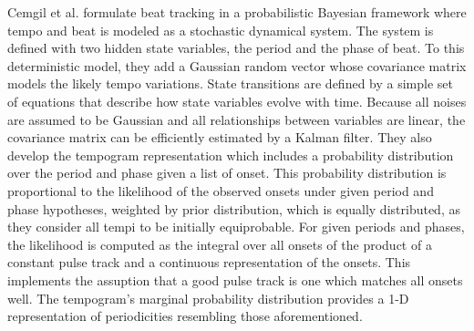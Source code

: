 \documentclass{scrartcl}
\begin{document}


Cemgil et al. \cite{Cemgil2001} formulate beat tracking in a probabilistic Bayesian framework where tempo and beat is modeled as a stochastic dynamical system. The system is defined with two hidden state variables, the period and the phase of beat. To this deterministic model, they add a Gaussian random vector whose covariance matrix models the likely tempo variations. State transitions are defined by a simple set of equations that describe how state variables evolve with time. 
Because all noises are assumed to be Gaussian and all relationships between variables are linear, the covariance matrix can be efficiently estimated by a Kalman filter. They also develop the tempogram representation which includes a probability distribution over the period and phase given a list of onset. This probability distribution is proportional to the likelihood of the observed onsets under given period and phase hypotheses, weighted by prior distribution, which is equally distributed, as they consider all tempi to be initially equiprobable. For given periods and phases, the likelihood is computed as the integral over all onsets of the product of a constant pulse track and a continuous representation of the onsets. This implements the assuption that a good pulse track is one which matches all onsets well. The tempogram's marginal probability distribution provides a 1-D representation of periodicities resembling those aforementioned. 
\end{document}
